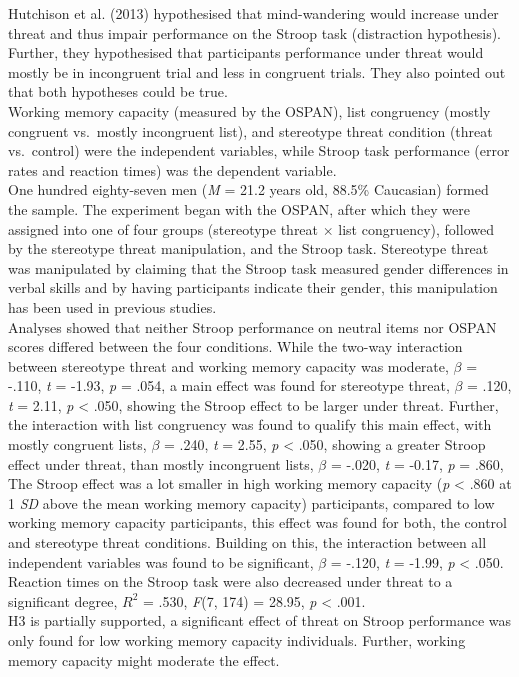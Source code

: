 \documentclass[
  stu,floatsintext]{apa7}
\begin{document}
Hutchison et al. (2013) hypothesised that mind-wandering would increase under threat and thus impair performance on the Stroop task (distraction hypothesis).
Further, they hypothesised that participants performance under threat would mostly be in incongruent trial and less in congruent trials.
They also pointed out that both hypotheses could be true.\\
Working memory capacity (measured by the OSPAN), list congruency (mostly congruent vs.~mostly incongruent list), and stereotype threat condition (threat vs.~control) were the independent variables, while Stroop task performance (error rates and reaction times) was the dependent variable.\\
One hundred eighty-seven men (\emph{M} = 21.2 years old, 88.5\% Caucasian) formed the sample.
The experiment began with the OSPAN, after which they were assigned into one of four groups (stereotype threat \(\times\) list congruency), followed by the stereotype threat manipulation, and the Stroop task.
Stereotype threat was manipulated by claiming that the Stroop task measured gender differences in verbal skills and by having participants indicate their gender, this manipulation has been used in previous studies.\\
Analyses showed that neither Stroop performance on neutral items nor OSPAN scores differed between the four conditions.
While the two-way interaction between stereotype threat and working memory capacity was moderate, \(\beta\) = -.110, \emph{t} = -1.93, \emph{p} = .054, a main effect was found for stereotype threat, \(\beta\) = .120, \emph{t} = 2.11, \emph{p} \textless{} .050, showing the Stroop effect to be larger under threat.
Further, the interaction with list congruency was found to qualify this main effect, with mostly congruent lists, \(\beta\) = .240, \emph{t} = 2.55, \emph{p} \textless{} .050, showing a greater Stroop effect under threat, than mostly incongruent lists, \(\beta\) = -.020, \emph{t} = -0.17, \emph{p} = .860,
The Stroop effect was a lot smaller in high working memory capacity (\emph{p} \textless{} .860 at 1 \emph{SD} above the mean working memory capacity) participants, compared to low working memory capacity participants, this effect was found for both, the control and stereotype threat conditions.
Building on this, the interaction between all independent variables was found to be significant, \(\beta\) = -.120, \emph{t} = -1.99, \emph{p} \textless{} .050.
Reaction times on the Stroop task were also decreased under threat to a significant degree, \(R^2\) = .530, \emph{F}(7, 174) = 28.95, \emph{p} \textless{} .001.\\
H3 is partially supported, a significant effect of threat on Stroop performance was only found for low working memory capacity individuals.
Further, working memory capacity might moderate the effect.
\end{document}
